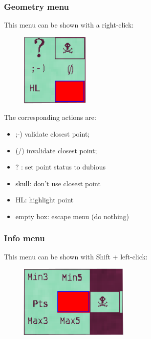 \subsubsection{Geometry menu}

This menu can be shown with a right-click:

\begin{figure}[H]
\begin{center}
\includegraphics[width=95pt]{FIGS/Saisie/geometry.png}
\end{center}
\label{FIG:button1}
\end{figure}

The corresponding actions are:
\begin{itemize}
\item ;-) validate closest point;
\item (/) invalidate closest point;
\item ? : set point status to dubious
\item skull: don't use closest point
\item HL: highlight point
\item empty box: escape menu (do nothing)
\end{itemize}


\subsubsection{Info menu}

This menu can be shown with Shift + left-click:
\begin{figure}[H]
\begin{center}
\includegraphics[width=154pt]{FIGS/Saisie/info.png}
\end{center}
\label{FIG:info}
\end{figure}

